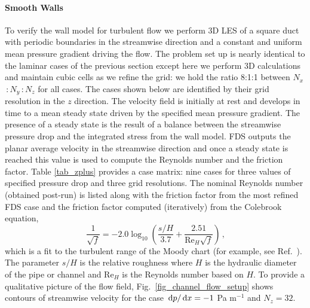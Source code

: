 \documentclass[11pt]{book}
\begin{document}
\paragraph{Smooth Walls}

To verify the wall model for turbulent flow we perform 3D LES of a square duct with periodic boundaries in the streamwise direction and a constant and uniform mean pressure gradient driving the flow.  The problem set up is nearly identical to the laminar cases of the previous section except here we perform 3D calculations and maintain cubic cells as we refine the grid: we hold the ratio 8:1:1 between $N_x$\,:\,$N_y$\,:\,$N_z$ for all cases.  The cases shown below are identified by their grid resolution in the $z$ direction.  The velocity field is initially at rest and develops in time to a mean steady state driven by the specified mean pressure gradient.  The presence of a steady state is the result of a balance between the streamwise pressure drop and the integrated stress from the wall model.  FDS outputs the planar average velocity in the streamwise direction and once a steady state is reached this value is used to compute the Reynolds number and the friction factor.  Table \ref{tab_zplus} provides a case matrix: nine cases for three values of specified pressure drop and three grid resolutions.  The nominal Reynolds number (obtained post-run) is listed along with the friction factor from the most refined FDS case and the friction factor computed (iteratively) from the Colebrook equation,
\begin{equation}
\label{eqn_colebrook}
\frac{1}{\sqrt{f}} = -2.0 \log_{10} \left( \frac{s/H}{3.7} + \frac{2.51}{\mbox{Re}_H\sqrt{f}} \right) \,\mbox{,}
\end{equation}
which is a fit to the turbulent range of the Moody chart (for example, see Ref.~\cite{MYO}).  The parameter $s/H$ is the relative
roughness where $H$ is the hydraulic diameter of the pipe or channel and Re$_H$ is the Reynolds number based on $H$.
To provide a qualitative picture of the flow field, Fig.~\ref{fig_channel_flow_setup} shows contours of streamwise velocity
for the case $\,\mathrm{d} p/\,\mathrm{d} x = -1$ Pa m$^{-1}$ and $N_z=32$.
\end{document}
